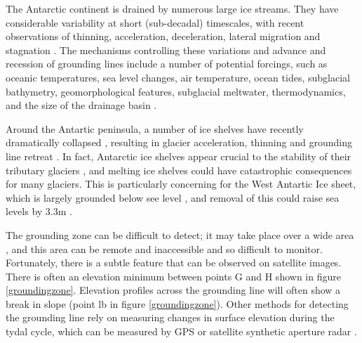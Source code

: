 \documentclass[a4paper,12pt]{article}
\begin{document}
The Antarctic continent is drained by numerous large ice streams. They have considerable variability at short (sub-decadal) timescales, with recent observations of thinning, acceleration, deceleration, lateral migration and stagnation \cite[]{livingstone2012antarctic}. The mechanisms controlling these variations and advance and recession of grounding lines include a number of potential forcings, such as oceanic temperatures, sea level changes, air temperature, ocean tides, subglacial bathymetry, geomorphological features, subglacial meltwater, thermodynamics, and the size of the drainage basin \cite[]{livingstone2012antarctic}.

Around the Antartic peninsula, a number of ice shelves have recently dramatically collapsed \cite[]{cook2010overview,scambos2009ice}, resulting in glacier acceleration, thinning and grounding line retreat \cite[]{pritchard2007widespread,rignot2004accelerated}. In fact, Antarctic ice shelves appear crucial to the stability of their tributary glaciers \cite[]{pritchard2012antarctic}, and melting ice shelves could have catastrophic consequences for many glaciers. This is particularly concerning for the West Antartic Ice sheet, which is largely grounded below see level \cite[]{lythe2001bedmap}, and removal of this could raise sea levels by 3.3m \cite[]{bamber2009reassessment,mercer1978west}.

The grounding zone can be difficult to detect; it may take place over a wide area \cite[]{fricker2009mapping}, and this area can be remote and inaccessible and so difficult to monitor. Fortunately, there is a subtle feature that can be observed on satellite images. There is often an elevation minimum between points G and H shown in figure \ref{groundingzone}. Elevation profiles across the grounding line will often show a break in slope (point lb in figure \ref{groundingzone}). Other methods for detecting the grounding line rely on measuring changes in surface elevation during the tydal cycle, which can be measured by GPS or satellite synthetic aperture radar \cite[]{rignot2011antarctic,fricker2009mapping,brunt2010mapping}.
\end{document}
